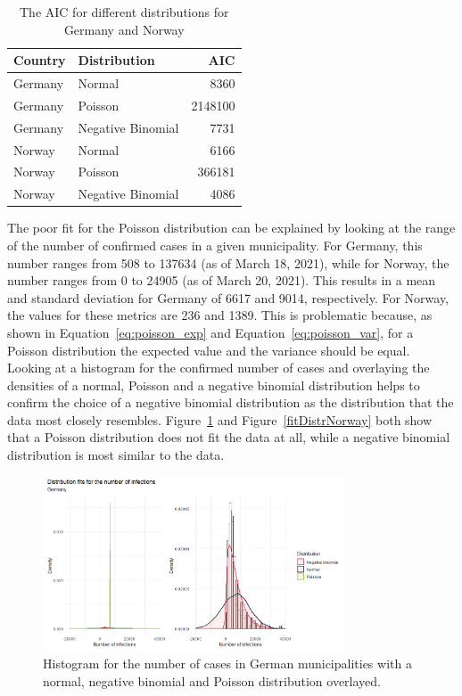 \begin{table}[H] 
\caption{The AIC for different distributions for Germany and Norway \label{aic}}
\begin{tabular}{l l r}
\toprule
\textbf{Country}	& \textbf{Distribution}	& \textbf{AIC} \\
\midrule
Germany & Normal & 8360 \\
Germany & Poisson & 2148100 \\
Germany & Negative Binomial & 7731 \\
Norway & Normal & 6166 \\
Norway & Poisson & 366181 \\
Norway & Negative Binomial & 4086 \\
\bottomrule
\end{tabular}
\end{table} 
The poor fit for the Poisson distribution can be explained by looking at the range of the number of confirmed cases in a given municipality. For Germany, this number ranges from 508 to 137634 (as of March 18, 2021), while for Norway, the number ranges from 0 to 24905 (as of March 20, 2021). This results in a mean and standard deviation for Germany of 6617 and 9014, respectively. For Norway, the values for these metrics are 236 and 1389. This is problematic because, as shown in Equation~\ref{eq:poisson_exp} and Equation~\ref{eq:poisson_var}, for a Poisson distribution the expected value and the variance should be equal. \\
Looking at a histogram for the confirmed number of cases and overlaying the densities of a normal, Poisson and a negative binomial distribution helps to confirm the choice of a negative binomial distribution as the distribution that the data most closely resembles. Figure~\ref{fitDistrGermany} and Figure~\ref{fitDistrNorway} both show that a Poisson distribution does not fit the data at all, while a negative binomial distribution is most similar to the data.
%     
\begin{figure}[H]
    \centering
    \includegraphics[width = 0.8\textwidth]{distrfit_germany.png}    
    \caption{Histogram for the number of cases in German municipalities with a normal, negative binomial and Poisson distribution overlayed.}
    \label{fitDistrGermany}
\end{figure}
